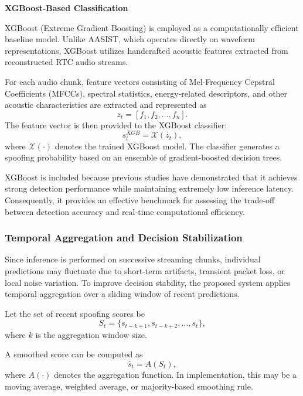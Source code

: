 \textbf{XGBoost-Based Classification}

XGBoost (Extreme Gradient Boosting) is employed as a computationally efficient baseline model. Unlike AASIST, which operates directly on waveform representations, XGBoost utilizes handcrafted acoustic features extracted from reconstructed RTC audio streams.

For each audio chunk, feature vectors consisting of Mel-Frequency Cepstral Coefficients (MFCCs), spectral statistics, energy-related descriptors, and other acoustic characteristics are extracted and represented as
\begin{equation}
z_t = [f_1,f_2,\ldots,f_n].
\end{equation}
The feature vector is then provided to the XGBoost classifier:
\begin{equation}
s_t^{XGB} = \mathcal{X}(z_t),
\end{equation}
where $\mathcal{X}(\cdot)$ denotes the trained XGBoost model. The classifier generates a spoofing probability based on an ensemble of gradient-boosted decision trees.

XGBoost is included because previous studies have demonstrated that it achieves strong detection performance while maintaining extremely low inference latency. Consequently, it provides an effective benchmark for assessing the trade-off between detection accuracy and real-time computational efficiency.

\subsubsection{Temporal Aggregation and Decision Stabilization}

Since inference is performed on successive streaming chunks, individual predictions may fluctuate due to short-term artifacts, transient packet loss, or local noise variation. To improve decision stability, the proposed system applies temporal aggregation over a sliding window of recent predictions.

Let the set of recent spoofing scores be
\begin{equation}
S_t = \{s_{t-k+1}, s_{t-k+2}, \ldots, s_t\},
\end{equation}
where \(k\) is the aggregation window size.

A smoothed score can be computed as
\begin{equation}
\bar{s}_t = A(S_t),
\end{equation}
where $A(\cdot)$ denotes the aggregation function. In implementation, this may be a moving average, weighted average, or majority-based smoothing rule.

